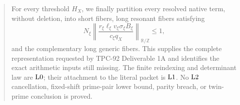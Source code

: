 \begin{abstract}
For every threshold \(H_X\), we finally partition every resolved
native term, without deletion, into short fibers, long resonant
fibers satisfying
\[
 N_\xi
 \left\|
 \frac{r_\xi\ell_\xi v_\xi\sigma_\xi B_\xi}
 {c_\xi q_X}
 \right\|_{\mathbb R/\mathbb Z}\le1,
\]
and the complementary long generic fibers.  This supplies the
complete representation requested by TPC-92 Deliverable 1A and
identifies the exact arithmetic inputs still missing.  The finite
reindexing and determinant law are \(\Lzero\); their attachment to
the literal packet is \(\Lone\).  No \(\Ltwo\) cancellation,
fixed-shift prime-pair lower bound, parity breach, or twin-prime
conclusion is proved.
\end{abstract}
